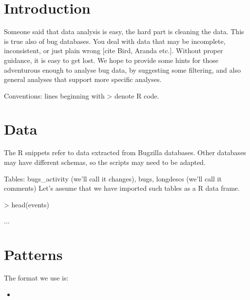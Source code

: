 \section{Introduction}

Someone said that data analysis is easy, the hard part is cleaning the data. This is true also of bug databases. You deal with data that may be incomplete, inconsistent, or just plain wrong [cite Bird, Aranda etc.]. Without proper guidance, it is easy to get lost. We hope to provide some hints for those adventurous enough to analyse bug data, by suggesting some filtering, and also general analyses that support more specific analyses.

Conventions: lines beginning with > denote R code.

\section{Data}

The R snippets refer to data extracted from Bugzilla databases. Other databases may have different schemas, so the scripts may need to be adapted.

Tables: bugs\_activity (we'll call it changes), bugs, longdescs (we'll call it comments)
Let's assume that we have imported such tables as a R data frame.

> head(events)

...

\section{Patterns}

The format we use is:

\begin{itemize}
  \item  
\end{itemize}


